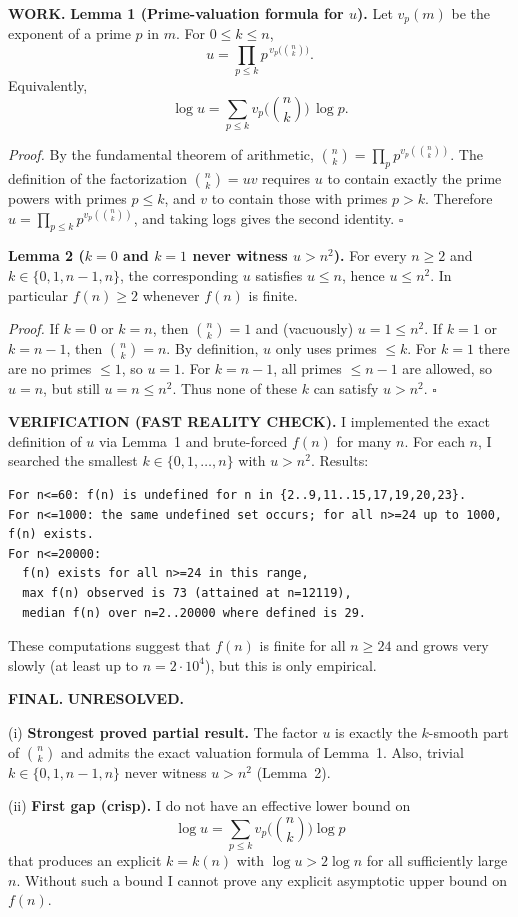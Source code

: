 \textbf{WORK.}
\textbf{Lemma 1 (Prime-valuation formula for $u$).}
Let $v_p(m)$ be the exponent of a prime $p$ in $m$. For $0\le k\le n$,
\[
 u = \prod_{p\le k} p^{\,v_p\bigl(\binom{n}{k}\bigr)}.
\]
Equivalently,
\[\log u = \sum_{p\le k} v_p\bigl(\binom{n}{k}\bigr)\,\log p.
\]

\emph{Proof.}
By the fundamental theorem of arithmetic,
$\binom{n}{k}=\prod_p p^{v_p(\binom{n}{k})}$.
The definition of the factorization $\binom{n}{k}=uv$ requires $u$ to contain exactly the prime powers with primes $p\le k$, and $v$ to contain those with primes $p>k$.
Therefore $u=\prod_{p\le k} p^{v_p(\binom{n}{k})}$, and taking logs gives the second identity.
\hfill$\square$

\textbf{Lemma 2 ($k=0$ and $k=1$ never witness $u>n^2$).}
For every $n\ge2$ and $k\in\{0,1,n-1,n\}$, the corresponding $u$ satisfies $u\le n$, hence $u\le n^{2}$.
In particular $f(n)\ge 2$ whenever $f(n)$ is finite.

\emph{Proof.}
If $k=0$ or $k=n$, then $\binom{n}{k}=1$ and (vacuously) $u=1\le n^{2}$.
If $k=1$ or $k=n-1$, then $\binom{n}{k}=n$.
By definition, $u$ only uses primes $\le k$. For $k=1$ there are no primes $\le1$, so $u=1$.
For $k=n-1$, all primes $\le n-1$ are allowed, so $u=n$, but still $u=n\le n^{2}$.
Thus none of these $k$ can satisfy $u>n^{2}$.
\hfill$\square$

\textbf{VERIFICATION (FAST REALITY CHECK).}
I implemented the exact definition of $u$ via Lemma~1 and brute-forced $f(n)$ for many $n$.
For each $n$, I searched the smallest $k\in\{0,1,\dots,n\}$ with $u>n^{2}$.
Results:
\begin{verbatim}
For n<=60: f(n) is undefined for n in {2..9,11..15,17,19,20,23}.
For n<=1000: the same undefined set occurs; for all n>=24 up to 1000, f(n) exists.
For n<=20000:
  f(n) exists for all n>=24 in this range,
  max f(n) observed is 73 (attained at n=12119),
  median f(n) over n=2..20000 where defined is 29.
\end{verbatim}
These computations suggest that $f(n)$ is finite for all $n\ge 24$ and grows very slowly (at least up to $n=2\cdot 10^{4}$), but this is only empirical.

\textbf{FINAL.}
\textbf{UNRESOLVED.}

(i) \textbf{Strongest proved partial result.}
The factor $u$ is exactly the $k$-smooth part of $\binom{n}{k}$ and admits the exact valuation formula of Lemma~1. Also, trivial $k\in\{0,1,n-1,n\}$ never witness $u>n^{2}$ (Lemma~2).

(ii) \textbf{First gap (crisp).}
I do not have an effective lower bound on
\[\log u = \sum_{p\le k} v_p\bigl(\binom{n}{k}\bigr)\log p\]
that produces an explicit $k=k(n)$ with $\log u > 2\log n$ for all sufficiently large $n$. Without such a bound I cannot prove any explicit asymptotic upper bound on $f(n)$.

